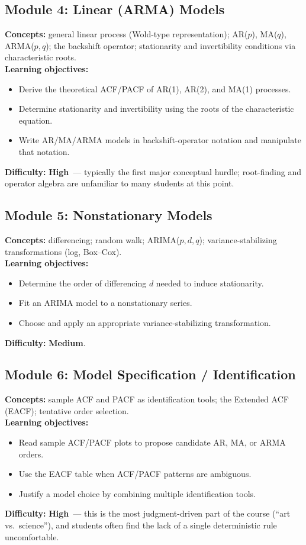 \documentclass[11pt]{article}
\newcommand{\Med}{\textcolor{diffMed}{\textbf{Medium}}}
\newcommand{\High}{\textcolor{diffHigh}{\textbf{High}}}
\newcommand{\module}[2]{\subsection*{Module #1: #2}}
\begin{document}
\module{4}{Linear (ARMA) Models}
\textbf{Concepts:} general linear process (Wold-type representation); AR($p$), MA($q$), ARMA($p,q$);
the backshift operator; stationarity and invertibility conditions via characteristic roots.\\
\textbf{Learning objectives:}
\begin{itemize}
  \item Derive the theoretical ACF/PACF of AR(1), AR(2), and MA(1) processes.
  \item Determine stationarity and invertibility using the roots of the characteristic equation.
  \item Write AR/MA/ARMA models in backshift-operator notation and manipulate that notation.
\end{itemize}
\textbf{Difficulty:} \High\ --- typically the first major conceptual hurdle; root-finding and operator
algebra are unfamiliar to many students at this point.

\module{5}{Nonstationary Models}
\textbf{Concepts:} differencing; random walk; ARIMA($p,d,q$); variance-stabilizing transformations
(log, Box--Cox).\\
\textbf{Learning objectives:}
\begin{itemize}
  \item Determine the order of differencing $d$ needed to induce stationarity.
  \item Fit an ARIMA model to a nonstationary series.
  \item Choose and apply an appropriate variance-stabilizing transformation.
\end{itemize}
\textbf{Difficulty:} \Med.

\module{6}{Model Specification / Identification}
\textbf{Concepts:} sample ACF and PACF as identification tools; the Extended ACF (EACF); tentative
order selection.\\
\textbf{Learning objectives:}
\begin{itemize}
  \item Read sample ACF/PACF plots to propose candidate AR, MA, or ARMA orders.
  \item Use the EACF table when ACF/PACF patterns are ambiguous.
  \item Justify a model choice by combining multiple identification tools.
\end{itemize}
\textbf{Difficulty:} \High\ --- this is the most judgment-driven part of the course (``art vs.\
science''), and students often find the lack of a single deterministic rule uncomfortable.
\end{document}
